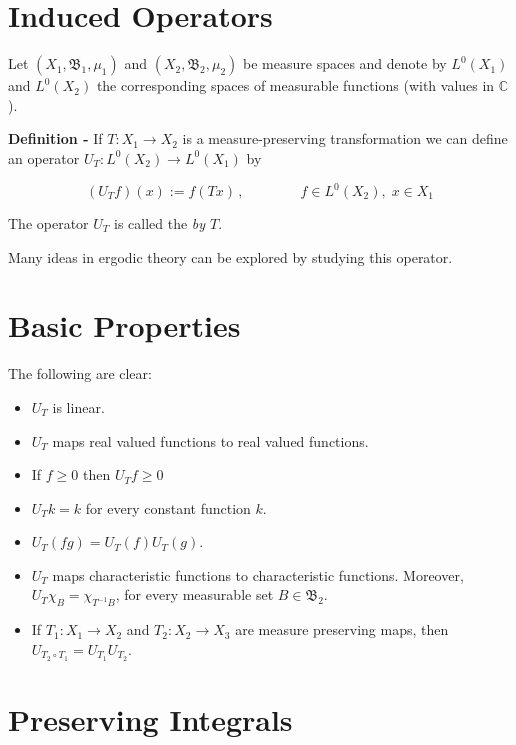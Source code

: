 \documentclass[12pt]{article}
\begin{document}

\section{Induced Operators}

Let $(X_1, \mathfrak{B}_1, \mu_1)$ and $(X_2, \mathfrak{B}_2, \mu_2)$ be measure spaces and denote by $L^0(X_1)$ and $L^0(X_2)$ the corresponding spaces of measurable functions (with values in $\mathbb{C}$).

{\bf Definition -} If $T: X_1 \longrightarrow X_2$ is a measure-preserving transformation we can define an operator $U_T:L^0(X_2) \longrightarrow L^0(X_1)$ by

\begin{displaymath}
(U_T f)(x):=f(Tx)\,, \qquad\qquad f \in L^0(X_2),\; x \in X_1
\end{displaymath}

The operator $U_T$ is called the \emph{ by $T$}.

 Many ideas in ergodic theory can be explored by studying this operator.

\section{Basic Properties}

The following  are clear:

\begin{itemize}
\item $U_T$ is linear.
\item $U_T$ maps real valued functions to real valued functions.
\item If $f \geq 0$ then $U_Tf \geq 0$ 
\item $U_T k = k$ for every constant function $k$.
\item $U_T(fg)=U_T(f)U_T(g)$.
\item $U_T$ maps characteristic functions to characteristic functions. Moreover, $U_T \chi_B = \chi_{T^{-1}B}$, for every measurable set $B \in \mathfrak{B}_2$.
\item If $T_1:X_1 \longrightarrow X_2$ and $T_2:X_2 \longrightarrow X_3$ are measure preserving maps, then $U_{T_2 \circ T_1} = U_{T_1}U_{T_2}$.
\end{itemize}

\section{Preserving Integrals}
\end{document}
